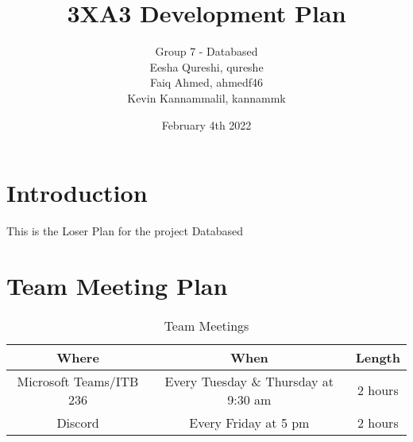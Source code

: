 \documentclass[12pt,letterpaper]{article}
\title{3XA3 Development Plan}
\author{Group 7 - Databased \\ Eesha Qureshi, qureshe \\ Faiq Ahmed, ahmedf46 \\ Kevin Kannammalil, kannammk}
\date{February 4th 2022}
\begin{document}
\maketitle



\newpage
\tableofcontents

\newpage
\section{Introduction}

This is the Loser Plan for the project Databased


\section{Team Meeting Plan}
\begin{table}[H]
    \centering
    \begin{tabular}{ |c|c|c| } 
    \hline
    Where & When & Length \\
    \hline
    Microsoft Teams/ITB 236 & Every Tuesday \& Thursday at 9:30 am & 2 hours \\
    Discord & Every Friday at 5 pm & 2 hours \\
    \hline
    \end{tabular}
    \caption{Team Meetings}
    \label{tab:teammeetings}
\end{table}
\end{document}
